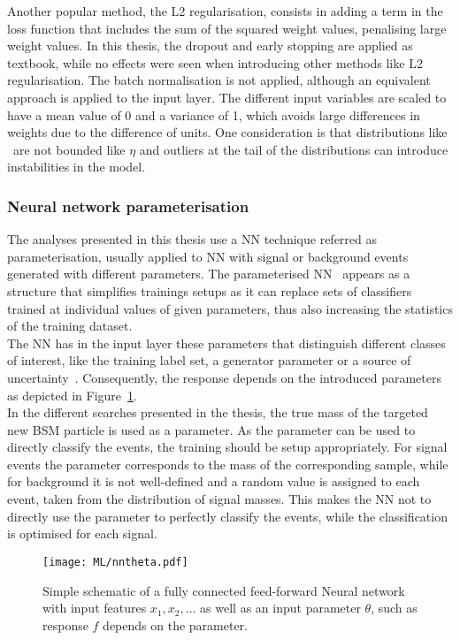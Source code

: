 Another popular method, the L2 regularisation, consists in adding a term in the loss function that includes the sum of the squared weight values, penalising large weight values. In this thesis, the dropout and early stopping are applied as textbook, while no effects were seen when introducing other methods like L2 regularisation. The batch normalisation is not applied, although an equivalent approach is applied to the input layer. The different input variables are scaled to have a mean value of 0 and a variance of 1, which avoids large differences in weights due to the difference of units. One consideration is that distributions like \pT\ are not bounded like $\eta$ and outliers at the tail of the distributions can introduce instabilities in the model.

\subsubsection{Neural network parameterisation}

The analyses presented in this thesis use a NN technique referred as parameterisation, usually applied to NN with signal or background events generated with different parameters. The parameterised NN~\cite{Baldi_2016} appears as a structure that simplifies trainings setups as it can replace sets of classifiers trained at individual values of given parameters, thus also increasing the statistics of the training dataset.\\

The NN has in the input layer these parameters that distinguish different classes of interest, like the training label set, a generator parameter or a source of uncertainty~\cite{Ghosh_2021}. Consequently, the response depends on the introduced parameters as depicted in Figure~\ref{ML:PNN}.\\

In the different searches presented in the thesis, the true mass of the targeted new BSM particle is used as a parameter. As the parameter can be used to directly classify the events, the training should be setup appropriately. For signal events the parameter corresponds to the mass of the corresponding sample, while for background it is not well-defined and a random value is assigned to each event, taken from the distribution of signal masses. This makes the NN not to directly use the parameter to perfectly classify the events, while the classification is optimised for each signal.

\begin{figure}[htbp]
    \RawFloats
    \begin{center}
    \texttt{[image: ML/nntheta.pdf]}
    \caption{
        Simple schematic of a fully connected feed-forward Neural network with input features $x_1, x_2,...$ as well as an input parameter $\theta$, such as response $f$ depends on the parameter.
    }
    \label{ML:PNN}
    \end{center}
\end{figure}

